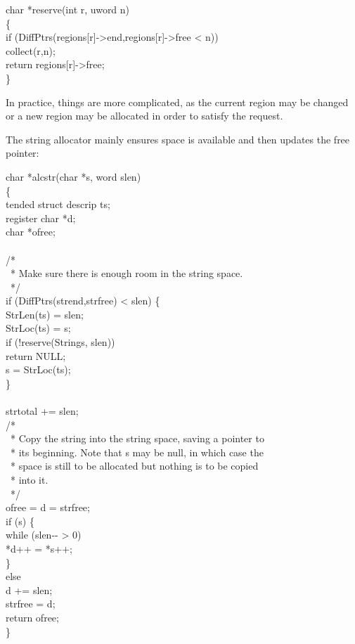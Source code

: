 \begin{iconcode}
\>char *reserve(int r, uword n)\\
\>\{\\
\>\>if (DiffPtrs(regions[r]->end,regions[r]->free < n))\\
\>\>\>collect(r,n);\\
\>\>return regions[r]->free;\\
\>\}
\end{iconcode}

\noindent
In practice, things are more complicated, as the current region may be
changed or a new region may be allocated in order to satisfy the
request.


The string allocator mainly ensures space is available and then
updates the free pointer:

\begin{iconcode}
\>char *alcstr(char *s, word slen)\\
\>\{\\
\>tended struct descrip ts;\\
\>register char *d;\\
\>char *ofree;\\
\\
\>/*\\
\>\ * Make sure there is enough room in the string space.\\
\>\ */\\
\>if (DiffPtrs(strend,strfree) < slen) \{\\
\>\>StrLen(ts) = slen;\\
\>\>StrLoc(ts) = s;\\
\>\>if (!reserve(Strings, slen))\\
\>\>\>return NULL;\\
\>\>s = StrLoc(ts);\\
\>\>\}\\
\\
\>strtotal += slen;\\
\>/*\\
\>\ * Copy the string into the string space, saving a pointer to\\
\>\ * its beginning. Note that s may be null, in which case the\\
\>\ * space is still to be allocated but nothing is to be copied\\
\>\ * into it.\\
\>\ */\\
\>ofree = d = strfree;\\
\>if (s) \{\\
\>\>while (slen-{}- > 0)\\
\>\>*d++ = *s++;\\
\>\>\}\\
\>else\\
\>\>d += slen;\\
\>strfree = d;\\
\>return ofree;\\
\>\}
\end{iconcode}


